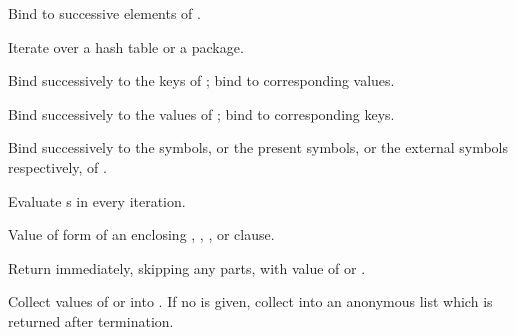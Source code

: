 \begin{LIST}{1cm}
\begin{LIST}{.5cm}
\begin{LIST}{.5cm}
      {
      Bind  to successive elements of .
      }

      {
      Iterate over a hash table or a package.
      }

      \begin{LIST}{.5cm}

        {
        Bind  successively to the keys of ; bind  to corresponding values.
        }

        {
        Bind  successively to the values of ; bind  to corresponding keys.
        }

        {
        Bind  successively to the symbols, or the present
        symbols, or the external symbols respectively, of
        . 
        }

      \end{LIST}
    \end{LIST}
    
    {
    Evaluate s in every iteration.
    }

    {
      Value of  form of an enclosing ,
      , , or  clause.
    }

    {
    Return immediately, skipping any  parts, with value of  or .
    }

    {
    Collect values of  or  into . If no
     is given, collect into an anonymous list which is
    returned after termination. 
    }


\end{LIST}
\end{LIST}
